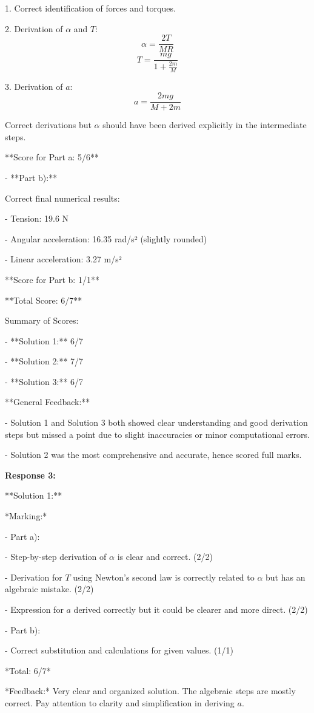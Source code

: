 \documentclass[a4paper,11pt]{article}
\begin{document}
  1. Correct identification of forces and torques.
  
  2. Derivation of \( \alpha \) and \( T \):
     \[ \alpha = \frac{2T}{MR} \]
     \[ T = \frac{mg}{1 + \frac{2m}{M}} \]
     
  3. Derivation of \( a \):
     \[ a = \frac{2mg}{M + 2m} \]

  Correct derivations but \( \alpha \) should have been derived explicitly in the intermediate steps.

  **Score for Part a: 5/6**

- **Part b):**

  Correct final numerical results:
  
  - Tension: 19.6 N
  
  - Angular acceleration: 16.35 rad/s² (slightly rounded)
  
  - Linear acceleration: 3.27 m/s²

  **Score for Part b: 1/1**

  **Total Score: 6/7**

Summary of Scores:

- **Solution 1:** 6/7

- **Solution 2:** 7/7

- **Solution 3:** 6/7

**General Feedback:**

- Solution 1 and Solution 3 both showed clear understanding and good derivation steps but missed a point due to slight inaccuracies or minor computational errors.

- Solution 2 was the most comprehensive and accurate, hence scored full marks.

\bigskip
\textbf{Response 3:}

**Solution 1:**

*Marking:*

- Part a):

  - Step-by-step derivation of \(\alpha\) is clear and correct. (2/2)
  
  - Derivation for \(T\) using Newton's second law is correctly related to \(\alpha\) but has an algebraic mistake. (2/2)
  
  - Expression for \(a\) derived correctly but it could be clearer and more direct. (2/2)
  
- Part b):

  - Correct substitution and calculations for given values. (1/1)

*Total: 6/7*

*Feedback:* Very clear and organized solution. The algebraic steps are mostly correct. Pay attention to clarity and simplification in deriving \(a\).
\end{document}
